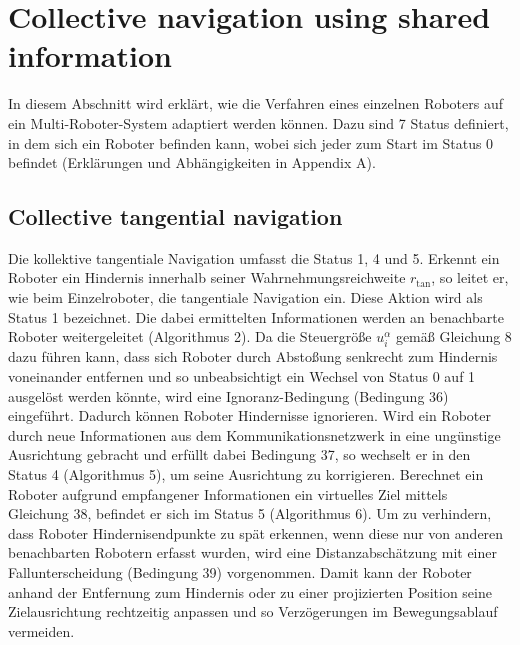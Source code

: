 \documentclass[conference]{IEEEtran}
\begin{document}
\section{Collective navigation using shared information}
In diesem Abschnitt wird erklärt, wie die Verfahren eines einzelnen Roboters auf ein 
Multi-Roboter-System adaptiert werden können. Dazu sind 7 Status definiert, in dem 
sich ein Roboter befinden kann, wobei sich jeder zum Start im Status 0 befindet 
(Erklärungen und Abhängigkeiten in Appendix A).

\subsection*{Collective tangential navigation}
Die kollektive tangentiale Navigation umfasst die Status 1, 4 und 5. Erkennt ein 
Roboter ein Hindernis innerhalb seiner Wahrnehmungsreichweite \( r_{\mathrm{tan}} \), so leitet er, 
wie beim Einzelroboter, die tangentiale Navigation ein. Diese Aktion wird als 
Status 1 bezeichnet. Die dabei ermittelten Informationen werden an benachbarte 
Roboter weitergeleitet (Algorithmus 2).
Da die Steuergröße \( u_i^\alpha \) gemäß Gleichung 8 dazu führen kann, dass sich Roboter 
durch Abstoßung senkrecht zum Hindernis voneinander entfernen und so unbeabsichtigt 
ein Wechsel von Status 0 auf 1 ausgelöst werden könnte, wird eine Ignoranz-Bedingung 
(Bedingung 36) eingeführt. Dadurch können Roboter Hindernisse ignorieren.
Wird ein Roboter durch neue Informationen aus dem Kommunikationsnetzwerk in eine 
ungünstige Ausrichtung gebracht und erfüllt dabei Bedingung 37, so wechselt er in 
den Status 4 (Algorithmus 5), um seine Ausrichtung zu korrigieren.
Berechnet ein Roboter aufgrund empfangener Informationen ein virtuelles Ziel mittels 
Gleichung 38, befindet er sich im Status 5 (Algorithmus 6).
Um zu verhindern, dass Roboter Hindernisendpunkte zu spät erkennen, wenn diese nur 
von anderen benachbarten Robotern erfasst wurden, wird eine Distanzabschätzung mit 
einer Fallunterscheidung (Bedingung 39) vorgenommen. Damit kann der Roboter anhand 
der Entfernung zum Hindernis oder zu einer projizierten Position seine 
Zielausrichtung rechtzeitig anpassen und so Verzögerungen im Bewegungsablauf vermeiden.
\end{document}
